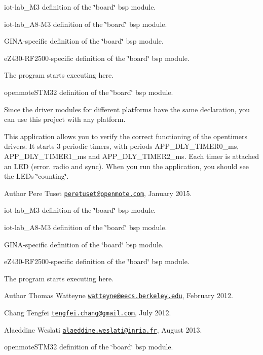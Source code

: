 iot-\/lab\+\_\+\+M3 definition of the \char`\"{}board\char`\"{} bsp module.

iot-\/lab\+\_\+\+A8-\/\+M3 definition of the \char`\"{}board\char`\"{} bsp module.

G\+I\+N\+A-\/specific definition of the \char`\"{}board\char`\"{} bsp module.

e\+Z430-\/\+R\+F2500-\/specific definition of the \char`\"{}board\char`\"{} bsp module.

The program starts executing here.

openmote\+S\+T\+M32 definition of the \char`\"{}board\char`\"{} bsp module.

Since the driver modules for different platforms have the same declaration, you can use this project with any platform.

This application allows you to verify the correct functioning of the opentimers drivers. It starts 3 periodic timers, with periods A\+P\+P\+\_\+\+D\+L\+Y\+\_\+\+T\+I\+M\+E\+R0\+\_\+ms, A\+P\+P\+\_\+\+D\+L\+Y\+\_\+\+T\+I\+M\+E\+R1\+\_\+ms and A\+P\+P\+\_\+\+D\+L\+Y\+\_\+\+T\+I\+M\+E\+R2\+\_\+ms. Each timer is attached an L\+ED (error. radio and sync). When you run the application, you should see the L\+E\+Ds \char`\"{}counting\char`\"{}.

\begin{DoxyAuthor}{Author}
Pere Tuset \href{mailto:peretuset@openmote.com}{\tt peretuset@openmote.\+com}, January 2015.
\end{DoxyAuthor}
iot-\/lab\+\_\+\+M3 definition of the \char`\"{}board\char`\"{} bsp module.

iot-\/lab\+\_\+\+A8-\/\+M3 definition of the \char`\"{}board\char`\"{} bsp module.

G\+I\+N\+A-\/specific definition of the \char`\"{}board\char`\"{} bsp module.

e\+Z430-\/\+R\+F2500-\/specific definition of the \char`\"{}board\char`\"{} bsp module.

The program starts executing here.

\begin{DoxyAuthor}{Author}
Thomas Watteyne \href{mailto:watteyne@eecs.berkeley.edu}{\tt watteyne@eecs.\+berkeley.\+edu}, February 2012. 

Chang Tengfei \href{mailto:tengfei.chang@gmail.com}{\tt tengfei.\+chang@gmail.\+com}, July 2012. 

Alaeddine Weslati \href{mailto:alaeddine.weslati@inria.fr}{\tt alaeddine.\+weslati@inria.\+fr}, August 2013.
\end{DoxyAuthor}
openmote\+S\+T\+M32 definition of the \char`\"{}board\char`\"{} bsp module.

